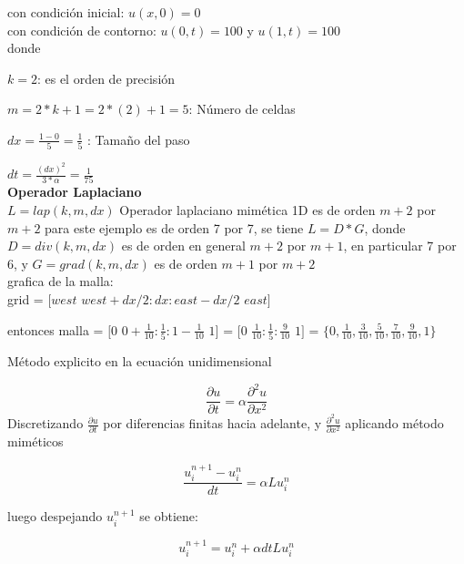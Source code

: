 \documentclass[a4paper,abstract=true]{scrreprt}
\begin{document}
con condición inicial: $u(x,0) = 0$\\

con condición de contorno: $u(0,t)= 100$ y $u(1,t) =100$\\

donde 

$k = 2$: es el orden de precisión

 $m = 2*k+1=2*(2)+1 = 5$: Número de celdas
 
$dx =\frac{1-0}{5} =\frac{1}{5}$ : Tamaño del paso 

$dt = \frac{(dx)^{2}}{3*\alpha} =\frac{1}{75}$\\

\textbf{\textbf{Operador Laplaciano}}\\

$L = lap(k,m,dx)$  Operador laplaciano mimética 1D es de orden $m+2$ por $m+2$ para este ejemplo es de orden  7 por 7,  se tiene $L = D* G$, donde $D = div(k,m,dx)$ es de orden en general $m+2$ por $m+1$, en particular 7 por 6, y $G = grad(k,m,dx)$ es de orden $m+1$ por $m+2$\\


grafica de la malla:\\


 grid = $[west$  $west+dx/2: dx :east-dx/2$  $east]$
 
entonces malla = $[0$ $0+\frac{1}{10}: \frac{1}{5}: 1-\frac{1}{10}$ $1  ]$ = $[0$ $\frac{1}{10}: \frac{1}{5}: \frac{9}{10}$ $1]$ = $  \{0, \frac{1}{10}, \frac{3}{10}, \frac{5}{10}, \frac{7}{10}, \frac{9}{10}, 1 \}$


Método explicito en la ecuación unidimensional

\begin{equation}
	\frac{\partial u}{\partial t} = \alpha \frac{\partial^{2} u}{\partial x^{2}}
\end{equation}
Discretizando  $\frac{\partial u}{\partial t}$ por diferencias finitas hacia adelante, y $\frac{\partial^{2} u}{\partial x^{2}}$ aplicando método miméticos

\begin{equation}	
	\frac{u^{n+1}_{i} - u^{n}_{i} }{dt} = \alpha L 	u^{n}_{i}
\end{equation}

 luego despejando $u^{n+1}_{i}$ se obtiene:
 
 \begin{equation}	
 	u^{n+1}_{i} = u^{n}_{i}  +  \alpha dt L u^{n}_{i}
 \end{equation}
\end{document}
